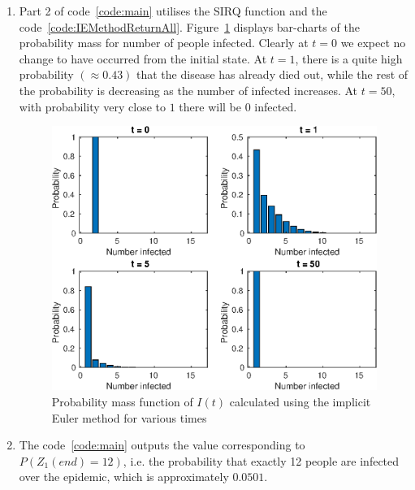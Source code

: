 \documentclass{/home/janmebows/Documents/LatexTemplates/myassignment}
\begin{document}
\begin{enumerate}
\begin{enumerate}[label=(\roman*)]
		\item %
				Part 2 of code~\ref{code:main} utilises the SIRQ function and the code~\ref{code:IEMethodReturnAll}. Figure~\ref{fig:pmfI} displays bar-charts of the probability mass for number of people infected. Clearly at $t=0$ we expect no change to have occurred from the initial state. At $t=1$, there is a quite high probability $(\approx 0.43)$ that the disease has already died out, while the rest of the probability is decreasing as the number of infected increases. At $t=50$, with probability very close to $1$ there will be $0$ infected. 

				\begin{figure}[h]
					\centering
					\label{fig:pmfI}
					\includegraphics[width = \linewidth]{TopicBA2Q22.eps}
					\caption{Probability mass function of $I(t)$ calculated using the implicit Euler method for various times}
				\end{figure}
		\item %
				The code~\ref{code:main} outputs the value corresponding to $P\left(Z_1(end) = 12\right)$, i.e. the probability that exactly 12 people are infected over the epidemic, which is approximately $0.0501$. 


\end{enumerate}
\end{enumerate}
\end{document}
